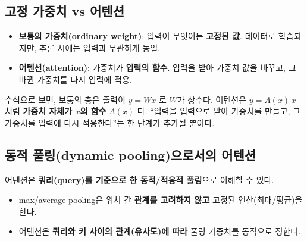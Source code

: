 \documentclass[
  korean,
]{article}
\providecommand{\tightlist}{%
  \setlength{\itemsep}{0pt}\setlength{\parskip}{0pt}}
\begin{document}
\subsection{고정 가중치 vs
어텐션}\label{uxace0uxc815-uxac00uxc911uxce58-vs-uxc5b4uxd150uxc158}

\begin{tcolorbox}[enhanced jigsaw, arc=.35mm, bottomrule=.15mm, bottomtitle=1mm, breakable, colback=white, colbacktitle=quarto-callout-important-color!10!white, colframe=quarto-callout-important-color-frame, coltitle=black, left=2mm, leftrule=.75mm, opacityback=0, opacitybacktitle=0.6, rightrule=.15mm, title=\textcolor{quarto-callout-important-color}{\faExclamation}\hspace{0.5em}{가장 중요한 구분}, titlerule=0mm, toprule=.15mm, toptitle=1mm]

\begin{itemize}
\tightlist
\item
  \textbf{보통의 가중치(ordinary weight)}: 입력이 무엇이든
  \textbf{고정된 값}. 데이터로 학습되지만, 추론 시에는 입력과 무관하게
  동일.
\item
  \textbf{어텐션(attention)}: 가중치가 \textbf{입력의 함수}. 입력을 받아
  가중치 값을 바꾸고, 그 바뀐 가중치를 다시 입력에 적용.
\end{itemize}

\end{tcolorbox}

수식으로 보면, 보통의 층은 출력이 \(y = Wx\) 로 \(W\)가 상수다. 어텐션은
\(y = A(x)\,x\) 처럼 \textbf{가중치 자체가 \(x\)의 함수} \(A(x)\) 다.
``입력을 입력으로 받아 가중치를 만들고, 그 가중치를 입력에 다시
적용한다''는 한 단계가 추가될 뿐이다.

\subsection{동적 풀링(dynamic pooling)으로서의
어텐션}\label{uxb3d9uxc801-uxd480uxb9c1dynamic-poolinguxc73cuxb85cuxc11cuxc758-uxc5b4uxd150uxc158}

어텐션은 \textbf{쿼리(query)를 기준으로 한 동적/적응적 풀링}으로 이해할
수 있다.

\begin{itemize}
\tightlist
\item
  max/average pooling은 위치 간 \textbf{관계를 고려하지 않고} 고정된
  연산(최대/평균)을 한다.
\item
  어텐션은 \textbf{쿼리와 키 사이의 관계(유사도)에 따라} 풀링 가중치를
  동적으로 정한다.
\end{itemize}
\end{document}
